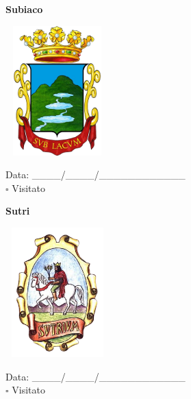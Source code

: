 \documentclass[a5paper,12pt]{article}
\begin{document}
\vspace{0.7cm}

\noindent
\begin{minipage}[t]{0.45\textwidth}
    \begin{center}
        \textbf{Subiaco}
    \end{center}
    \vspace{-0.5cm} %
    \begin{center}
        \includegraphics[height= 5cm, width=4cm]{Lazio/Stemma Subiaco.png}
    \end{center}
    \vspace{-0.4cm} %
    \begin{flushleft}
        Data: \_\_\_\_/\_\_\_\_/\_\_\_\_\_\_\_\_\_\_\_\_ \\
        $\square$ Visitato
    \end{flushleft}
\end{minipage}
\hfill
\noindent
\begin{minipage}[t]{0.45\textwidth}
    \begin{center}
        \textbf{Sutri}
    \end{center}
    \vspace{-0.5cm} %
    \begin{center}
        \includegraphics[height= 5cm, width=4cm]{Lazio/Stemma Sutri.png}
    \end{center}
    \vspace{-0.4cm} %
    \begin{flushleft}
        Data: \_\_\_\_/\_\_\_\_/\_\_\_\_\_\_\_\_\_\_\_\_ \\
        $\square$ Visitato
    \end{flushleft}
\end{minipage}
\end{document}
